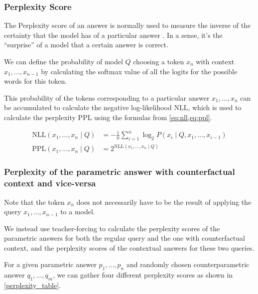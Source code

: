\subsubsection{Perplexity Score}
\newcommand{\NLL}{\text{NLL}}
\newcommand{\PPL}{\text{PPL}}

The Perplexity score of an answer is normally used to measure the inverse of the certainty that the model has of a particular answer \citep{fewshotlearners,retro}.
In a sense, it's the ``surprise'' of a model that a certain answer is correct.

We can define the probability of model $Q$ choosing a token $x_n$ with context $x_1, \dots, x_{n - 1}$ by calculating the softmax value of all the logits for the possible words for this token.

This probability of the tokens corresponding to a particular answer $x_1, \dots, x_n$ can be accumulated to calculate the negative log-likelihood NLL, which is used to calculate the perplexity PPL using the formulas from \cref{eq:nll,eq:ppl}.

\begin{align}
	\NLL \left( x_1, \dots, x_n \mid Q \right) &= - \frac{1}{n} \sum^n_{i = 1} \log_2 P \left( x_i \mid Q, x_1, \dots, x_{i - 1} \right) \label{eq:nll} \\
	\PPL \left( x_1, \dots, x_n \mid Q \right) &= {2 ^ {\text{NLL} \left( x_1, \dots, x_n \mid Q \right)}} \label{eq:ppl}
\end{align}

\subsubsection{Perplexity of the parametric answer with counterfactual context and vice-versa}

Note that the token $x_n$ does not necessarily have to be the result of applying the query $x_1, \dots, x_{n - 1}$ to a model.

We instead use teacher-forcing \citep{teacher_forcing} to calculate the perplexity scores of the parametric answers for both the regular query and the one with counterfactual context, and the perplexity scores of the contextual answers for these two queries.

For a given parametric answer $p_1, \dots, p_n$ and randomly chosen counterparametric answer $q_1, \dots, q_m$, we can gather four different perplexity scores as shown in \cref{perplexity_table}.

